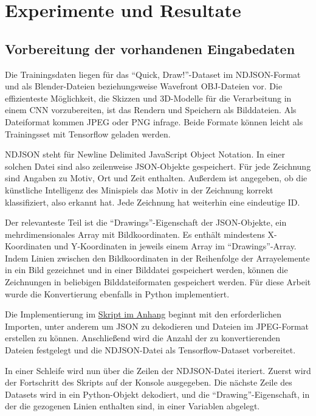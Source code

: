 \chapter{Experimente und Resultate}
\label{ch:conduct}

\section{Vorbereitung der vorhandenen Eingabedaten}
\label{sec:preparation}
Die Trainingsdaten liegen für das ``Quick, Draw!''-Dataset im NDJSON-Format und als Blender-Dateien beziehungsweise
Wavefront OBJ-Dateien vor. Die effizienteste Möglichkeit, die Skizzen und 3D-Modelle für die Verarbeitung in einem CNN vorzubereiten, ist das Rendern und  Speichern als Bilddateien. Als Dateiformat kommen JPEG oder PNG infrage. Beide Formate können leicht als Trainingsset mit Tensorflow geladen werden.

NDJSON steht für Newline Delimited JavaScript Object Notation. In einer solchen Datei sind also zeilenweise JSON-Objekte gespeichert. Für jede Zeichnung sind Angaben zu Motiv, Ort und Zeit enthalten. Außerdem ist angegeben, ob die künstliche Intelligenz des Minispiels das Motiv in der Zeichnung korrekt klassifiziert, also erkannt hat. Jede Zeichnung hat weiterhin eine eindeutige ID.

Der relevanteste Teil ist die ``Drawings''-Eigenschaft der JSON-Objekte, ein mehrdimensionales Array mit Bildkoordinaten. Es enthält mindestens X-Koordinaten und Y-Koordinaten in jeweils einem Array im ``Drawings''-Array. Indem Linien zwischen den Bildkoordinaten in der Reihenfolge der Arrayelemente in ein Bild gezeichnet und in einer Bilddatei gespeichert werden, können die Zeichnungen in beliebigen Bilddateiformaten gespeichert werden. Für diese Arbeit wurde die Konvertierung ebenfalls in Python implementiert.

Die Implementierung im \hyperref[ndjsonpy]{Skript im Anhang} beginnt mit den erforderlichen Importen, unter anderem um JSON zu dekodieren und Dateien im JPEG-Format erstellen zu können. Anschließend wird die Anzahl der zu konvertierenden Dateien festgelegt und die NDJSON-Datei als Tensorflow-Dataset vorbereitet.

In einer Schleife wird nun über die Zeilen der NDJSON-Datei iteriert. Zuerst wird der Fortschritt des Skripts auf der Konsole ausgegeben. Die nächste Zeile des Datasets wird in ein Python-Objekt dekodiert, und die ``Drawing''-Eigenschaft, in der die gezogenen Linien enthalten sind, in einer Variablen abgelegt.

